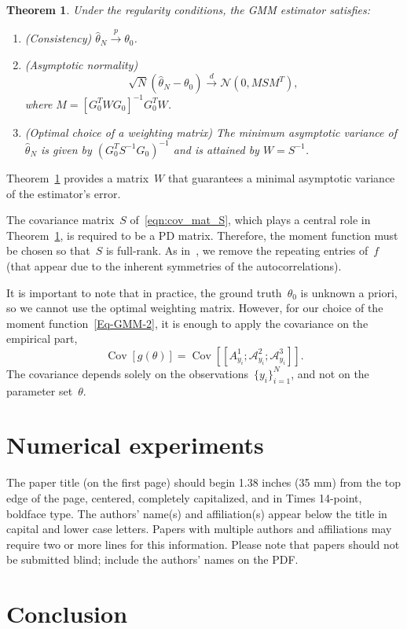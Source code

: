 \documentclass{article}
\newtheorem{theorem}[assumption]{Theorem}%
\newcommand{\A}[0]{\mathcal{A}}
\newcommand{\Cov}[0]{\operatorname{Cov}}
\begin{document}
\begin{theorem}\label{Thm-2-6}
	Under {the} regularity conditions, the GMM estimator satisfies:
	\begin{enumerate}[label={\Alph*}.]
		\item  \label{Thm-2-2}
		\textnormal{(Consistency)} $\hat{\theta}_N \overset{p}{\to} \theta_0$.

		\item \label{Thm-2-3} \textnormal{(Asymptotic normality)}
		\[\sqrt{N} ( \hat{\theta}_N - \theta_0) \overset{d}{\to} \mathcal{N}(0, M S M^T ),\] where $M =[G_0^T W  G_0]^{-1} G_0^T  W$.

		\item \label{Thm-2-5} \textnormal{(Optimal choice of a weighting matrix)} The minimum asymptotic variance of $\hat{\theta}_N$ is given by $(G_0^T S^{-1} G_0)^{-1}$ and is attained by $W = S^{-1}$.
	\end{enumerate}
\end{theorem}
Theorem~\ref{Thm-2-6} provides a matrix~$W$ {that} guarantees a minimal asymptotic variance of the estimator’s error.

The covariance matrix~$S$ {of~\eqref{eqn:cov_mat_S}, which plays a central role in Theorem~\ref{Thm-2-6},} is required to be a PD matrix. Therefore, the moment function must be chosen so that~$S$ is full-rank. As in~\cite{abas2021generalized},  we remove the repeating entries of~$f$ (that appear due to the inherent symmetries of the autocorrelations).

It is important to note that in practice, the ground truth~$\theta_0$ is unknown a priori, so we cannot use the optimal weighting matrix. However, for our choice of the moment function~\eqref{Eq-GMM-2}, it is enough to apply the covariance on the empirical part,
	\begin{equation}\label{Eq-2-7}
		\Cov[g(\theta)] = \Cov\left[\left[A_{y_i}^1;\A_{y_i}^2;\A_{y_i}^3\right]\right].
	\end{equation}
	The covariance depends solely on the observations~$\{y_i\}_{i=1}^N$, and  not on  the parameter set~$\theta$. 

\section{Numerical experiments}
\label{sec:numerical}

The paper title (on the first page) should begin 1.38 inches (35 mm) from the
top edge of the page, centered, completely capitalized, and in Times 14-point,
boldface type.  The authors' name(s) and affiliation(s) appear below the title
in capital and lower case letters.  Papers with multiple authors and
affiliations may require two or more lines for this information. Please note
that papers should not be submitted blind; include the authors' names on the
PDF.

\section{Conclusion}
\label{sec:conclusion}



\vfill\pagebreak



\end{document}
